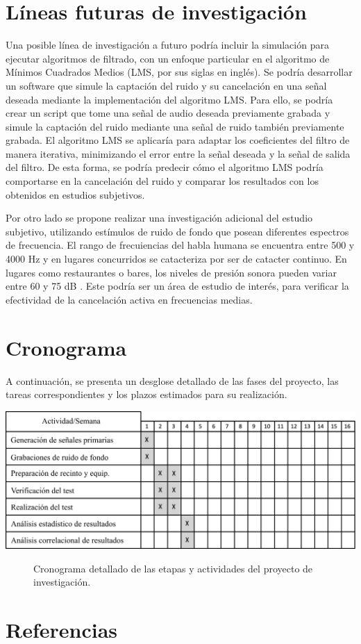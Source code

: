 \documentclass[a4paper,12pt]{article}
\begin{document}
\section{Líneas futuras de investigación}
\label{sec:furtherInvestigation}

Una posible línea de investigación a futuro podría incluir la simulación para ejecutar algoritmos de filtrado, con un enfoque particular en el algoritmo de Mínimos Cuadrados Medios (LMS, por sus siglas en inglés).
Se podría desarrollar un software que simule la captación del ruido y su cancelación en una señal deseada mediante la implementación del algoritmo LMS.
Para ello, se podría crear un script que tome una señal de audio deseada previamente grabada y simule la captación del ruido mediante una señal de ruido también previamente grabada.
El algoritmo LMS se aplicaría para adaptar los coeficientes del filtro de manera iterativa, minimizando el error entre la señal deseada y la señal de salida del filtro.
De esta forma, se podría predecir cómo el algoritmo LMS podría comportarse en la cancelación del ruido y comparar los resultados con los obtenidos en estudios subjetivos.

Por otro lado se propone realizar una investigación adicional del estudio subjetivo, utilizando estímulos de ruido de fondo que posean diferentes espectros de frecuencia.
El rango de frecuiencias del habla humana se encuentra entre 500 y 4000 $\si{\hertz}$ y en lugares concurridos se catacteriza por ser de catacter continuo.
En lugares como restaurantes o bares, los niveles de presión sonora pueden variar entre 60 y 75 \si{\deci \bel} \parencite{Scott2024}.
Este podría ser un área de estudio de interés, para verificar la efectividad de la cancelación activa en frecuencias medias.

\section{Cronograma}

A continuación, se presenta un desglose detallado de las fases del proyecto, las tareas correspondientes y los plazos estimados para su realización.

\begin{center}
    \includegraphics[width=\linewidth]{images/schedule.png}
\end{center}
\vspace{\captionSpace}
\begin{figure}[H]
    \caption{Cronograma detallado de las etapas y actividades del proyecto de investigación.}
    \label{fig:schedule}
\end{figure}

\section{Referencias}
\renewcommand{\refname}{}
\vspace{-3em}
\printbibliography
\end{document}
